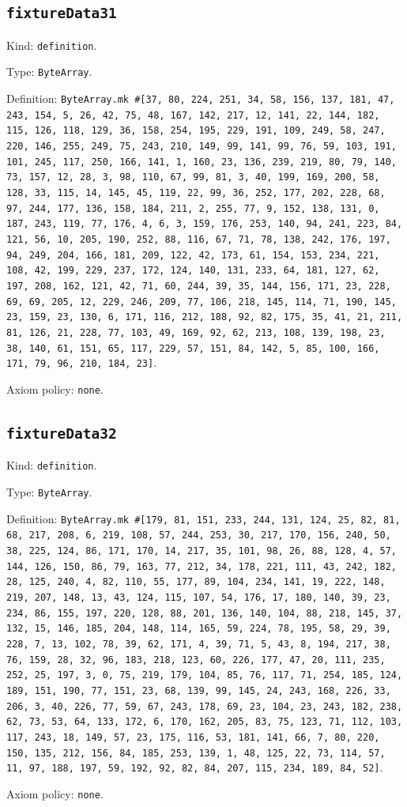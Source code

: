 \documentclass[11pt]{article}
\begin{document}
\subsection*{\texttt{fixtureData31}}
\noindent Kind: \texttt{definition}.\par
\noindent Type: \texttt{ByteArray}.\par
\noindent Definition: \texttt{ByteArray.mk \#[37, 80, 224, 251, 34, 58, 156, 137, 181, 47, 243, 154, 5, 26, 42, 75, 48, 167, 142, 217, 12, 141, 22, 144, 182, 115, 126, 118, 129, 36, 158, 254, 195, 229, 191, 109, 249, 58, 247, 220, 146, 255, 249, 75, 243, 210, 149, 99, 141, 99, 76, 59, 103, 191, 101, 245, 117, 250, 166, 141, 1, 160, 23, 136, 239, 219, 80, 79, 140, 73, 157, 12, 28, 3, 98, 110, 67, 99, 81, 3, 40, 199, 169, 200, 58, 128, 33, 115, 14, 145, 45, 119, 22, 99, 36, 252, 177, 202, 228, 68, 97, 244, 177, 136, 158, 184, 211, 2, 255, 77, 9, 152, 138, 131, 0, 187, 243, 119, 77, 176, 4, 6, 3, 159, 176, 253, 140, 94, 241, 223, 84, 121, 56, 10, 205, 190, 252, 88, 116, 67, 71, 78, 138, 242, 176, 197, 94, 249, 204, 166, 181, 209, 122, 42, 173, 61, 154, 153, 234, 221, 108, 42, 199, 229, 237, 172, 124, 140, 131, 233, 64, 181, 127, 62, 197, 208, 162, 121, 42, 71, 60, 244, 39, 35, 144, 156, 171, 23, 228, 69, 69, 205, 12, 229, 246, 209, 77, 106, 218, 145, 114, 71, 190, 145, 23, 159, 23, 130, 6, 171, 116, 212, 188, 92, 82, 175, 35, 41, 21, 211, 81, 126, 21, 228, 77, 103, 49, 169, 92, 62, 213, 108, 139, 198, 23, 38, 140, 61, 151, 65, 117, 229, 57, 151, 84, 142, 5, 85, 100, 166, 171, 79, 96, 210, 184, 23]}.\par
\noindent Axiom policy: \texttt{none}.\par
\subsection*{\texttt{fixtureData32}}
\noindent Kind: \texttt{definition}.\par
\noindent Type: \texttt{ByteArray}.\par
\noindent Definition: \texttt{ByteArray.mk \#[179, 81, 151, 233, 244, 131, 124, 25, 82, 81, 68, 217, 208, 6, 219, 108, 57, 244, 253, 30, 217, 170, 156, 240, 50, 38, 225, 124, 86, 171, 170, 14, 217, 35, 101, 98, 26, 88, 128, 4, 57, 144, 126, 150, 86, 79, 163, 77, 212, 34, 178, 221, 111, 43, 242, 182, 28, 125, 240, 4, 82, 110, 55, 177, 89, 104, 234, 141, 19, 222, 148, 219, 207, 148, 13, 43, 124, 115, 107, 54, 176, 17, 180, 140, 39, 23, 234, 86, 155, 197, 220, 128, 88, 201, 136, 140, 104, 88, 218, 145, 37, 132, 15, 146, 185, 204, 148, 114, 165, 59, 224, 78, 195, 58, 29, 39, 228, 7, 13, 102, 78, 39, 62, 171, 4, 39, 71, 5, 43, 8, 194, 217, 38, 76, 159, 28, 32, 96, 183, 218, 123, 60, 226, 177, 47, 20, 111, 235, 252, 25, 197, 3, 0, 75, 219, 179, 104, 85, 76, 117, 71, 254, 185, 124, 189, 151, 190, 77, 151, 23, 68, 139, 99, 145, 24, 243, 168, 226, 33, 206, 3, 40, 226, 77, 59, 67, 243, 178, 69, 23, 104, 23, 243, 182, 238, 62, 73, 53, 64, 133, 172, 6, 170, 162, 205, 83, 75, 123, 71, 112, 103, 117, 243, 18, 149, 57, 23, 175, 116, 53, 181, 141, 66, 7, 80, 220, 150, 135, 212, 156, 84, 185, 253, 139, 1, 48, 125, 22, 73, 114, 57, 11, 97, 188, 197, 59, 192, 92, 82, 84, 207, 115, 234, 189, 84, 52]}.\par
\noindent Axiom policy: \texttt{none}.\par
\end{document}
